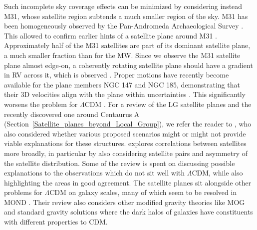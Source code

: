 \documentclass[fleqn,usenatbib,useAMS]{mnras} %
\begin{document}
Such incomplete sky coverage effects can be minimized by considering instead M31, whose satellite region subtends a much smaller region of the sky. M31 has been homogeneously observed by the Pan-Andromeda Archaeological Survey \citep{McConnachie_2009, McConnachie_2018}. This allowed \citet{Ibata_2013} to confirm earlier hints of a satellite plane around M31 \citep{Metz_2007}. Approximately half of the M31 satellites are part of its dominant satellite plane, a much smaller fraction than for the MW. Since we observe the M31 satellite plane almost edge-on, a coherently rotating satellite plane should have a gradient in RV across it, which is observed \citep{Ibata_2013}. Proper motions have recently become available for the plane members NGC 147 and NGC 185, demonstrating that their 3D velocities align with the plane within uncertainties \citep{Sohn_2020}. This significantly worsens the problem for $\Lambda$CDM \citep{Pawlowski_Sohn_2021}. For a review of the LG satellite planes and the recently discovered one around Centaurus A (Section~\ref{Satellite_planes_beyond_Local_Group}), we refer the reader to \citet{Pawlowski_2018}, who also considered whether various proposed scenarios might or might not provide viable explanations for these structures. \citet{Pawlowski_2021} explores correlations between satellites more broadly, in particular by also considering satellite pairs and asymmetry of the satellite distribution. Some of the review is spent on discussing possible explanations to the observations which do not sit well with $\Lambda$CDM, while also highlighting the areas in good agreement. The satellite planes sit alongside other problems for $\Lambda$CDM on galaxy scales, many of which seem to be resolved in MOND \citep{Martino_2020}. Their review also considers other modified gravity theories like MOG and standard gravity solutions where the dark halos of galaxies have constituents with different properties to CDM.
\end{document}
